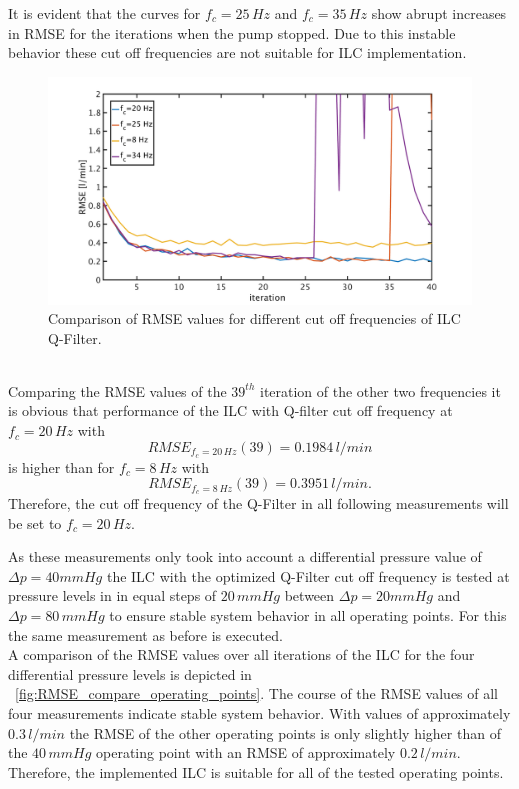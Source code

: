 It is evident that the curves for $f_c=25\,Hz$ and $f_c=35\,Hz$ show abrupt increases in RMSE for the iterations when the pump stopped. Due to this instable behavior these cut off frequencies are not suitable for ILC implementation.
\begin{figure}[ht]
  \centering
  \includegraphics[width=\textwidth]{images/chapt_5/ILC/RMSE_compare_ILC3_fc.pdf}
  \caption[Comparison of RMSE values for different cut off frequencies of ILC Q-Filter]{Comparison of RMSE values for different cut off frequencies of ILC Q-Filter.}
  \label{fig:RMSE_compare_ILC3_fc}
\end{figure}
\\Comparing the RMSE values of the $39^{th}$ iteration of the other two frequencies it is obvious that performance of the ILC with Q-filter cut off frequency at $f_c=20\,Hz$ with
\begin{equation}
  RMSE_{f_c=20\,Hz}(39)=0.1984\,l/min
\end{equation}
is higher than for $f_c=8\,Hz$ with
\begin{equation}
  RMSE_{f_c=8\,Hz}(39)=0.3951\,l/min.
\end{equation}
Therefore, the cut off frequency of the Q-Filter in all following measurements will be set to $f_c=20\,Hz$.

As these measurements only took into account a differential pressure value of $\Delta{p}=40mmHg$ the ILC with the optimized Q-Filter cut off frequency is tested at pressure levels in in equal steps of $20\,mmHg$ between $\Delta{p}=20mmHg$ and $\Delta{p}=80\,mmHg$ to ensure stable system behavior in all operating points. For this the same measurement as before is executed.
\\A comparison of the RMSE values over all iterations of the ILC for the four differential pressure levels is depicted in \figurename~\ref{fig:RMSE_compare_operating_points}. The course of the RMSE values of all four measurements indicate stable system behavior. With values of approximately $0.3\, l/min$ the RMSE of the other operating points is only slightly higher than of the $40\,mmHg$ operating point with an RMSE of approximately $0.2\,l/min$. Therefore, the implemented ILC is suitable for all of the tested operating points.

